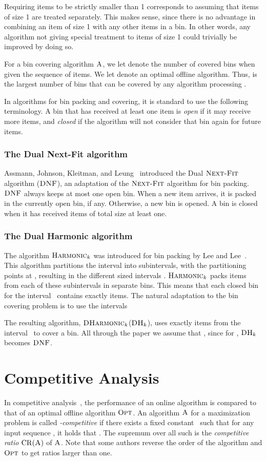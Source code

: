 \documentclass[11pt]{article}
\newcommand{\ALG}{\ensuremath{\operatorname{\textsc{A}}}\xspace}
\newcommand{\OPT}{\ensuremath{\operatorname{\textsc{Opt}}}\xspace}
\newcommand{\DNF}{\ensuremath{\operatorname{\textsc{DNF}}}\xspace}
\newcommand{\nextfit}{\ensuremath{\operatorname{\textsc{Next-Fit}}}\xspace}
\newcommand{\harm}{{\ensuremath{\textsc{Harmonic}_k}}\xspace}
\newcommand{\Har}{{\ensuremath{\textsc{DHarmonic}_k}}\xspace}
\newcommand{\DHk}{{\ensuremath{\textsc{DH}_k}}\xspace}
\newcommand{\CR}[1]{\ensuremath{\mathrm{CR}(#1)}\xspace}
\begin{document}
Requiring items to be strictly smaller than 1 corresponds to assuming
 that items of size 1 are treated separately.
This makes sense, since there is no advantage in combining an item of
 size 1 with any other items in a bin.
In other words, any algorithm not giving special treatment to items
of size 1 could trivially be improved by doing so.

For a bin covering algorithm \ALG, we let  denote the number
 of covered bins when given the sequence  of items. 
We let  denote an optimal offline algorithm.
Thus,  is the largest number of bins that can be covered
by any algorithm processing .

In algorithms for bin packing and covering, it is standard to use the
following terminology.
A bin that has received at least one item is \emph{open} if it may
receive more items, and \emph{closed}
if the algorithm will not consider
that bin again for future items.

\subsubsection*{The Dual Next-Fit algorithm}
Assmann, Johnson, Kleitman, and Leung~\cite{AJKL84j} introduced the
Dual \nextfit algorithm 
(\DNF), an adaptation of the \nextfit algorithm for bin packing.
\DNF always keeps at most one open bin. 
When a new item arrives, it is packed in the currently open bin, if
 any.
Otherwise, a new bin is opened.
A bin is closed when it has received items of total size at least one.

\subsubsection*{The Dual Harmonic algorithm}
The algorithm \harm was introduced for bin packing by Lee and Lee~\cite{HL85}. This algorithm
partitions the interval  into  subintervals,
with the partitioning points at ,
resulting in the different sized intervals
.
\harm packs items from each of
these  subintervals in separate bins.
This means that each closed bin for the interval~ 
contains exactly  items.
The natural adaptation to the bin covering problem is to use the intervals

The resulting algorithm, \Har (\DHk), uses exactly  items from the
interval~ to cover a bin.
All through the paper we assume that , since for ,
\DHk becomes \DNF.

\section{Competitive Analysis}
\label{competitive-analysis}
In competitive analysis~\cite{ST85,KMRS88}, the performance of an online
algorithm is compared to that of an optimal offline algorithm \OPT. 
An algorithm \ALG for a maximization problem is called
\emph{-competitive} if there exists a fixed 
constant~ such that for any input sequence ,
it holds that .
The supremum over all such  is the \emph{competitive ratio} \CR{\ALG} of \ALG.
Note that some authors reverse the order of the algorithm and \OPT to get
ratios larger than one.
\end{document}
